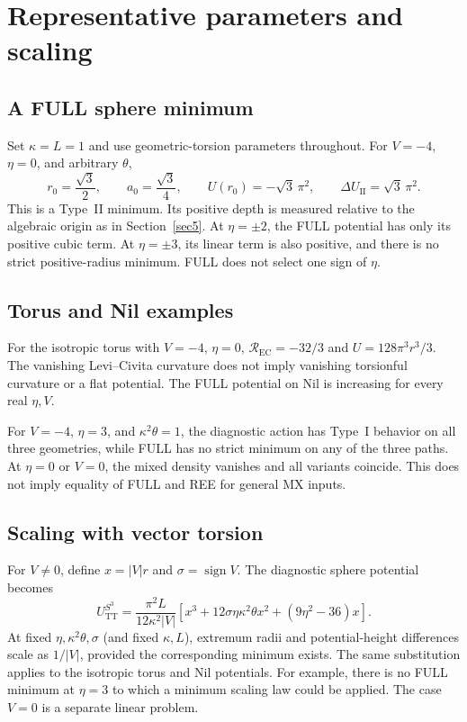\section{Representative parameters and scaling}\label{sec6}
\subsection{A FULL sphere minimum}
Set $\kappa=L=1$ and use geometric-torsion parameters throughout.
For $V=-4$, $\eta=0$, and arbitrary $\theta$,
\begin{equation}
r_0=\frac{\sqrt3}{2},\qquad
a_0=\frac{\sqrt3}{4},\qquad
U(r_0)=-\sqrt3\,\pi^2,\qquad
\Delta U_{\mathrm{II}}=\sqrt3\,\pi^2.
\tag{M6-01}\label{eq:M6-01}
\end{equation}
This is a Type~II minimum. Its positive depth is measured relative to
the algebraic origin as in Section~\ref{sec5}.
At $\eta=\pm2$, the FULL potential has only its positive cubic term.
At $\eta=\pm3$, its linear term is also positive, and there is no
strict positive-radius minimum. FULL does not select one sign of $\eta$.

\subsection{Torus and Nil examples}
For the isotropic torus with $V=-4$, $\eta=0$,
$\mathcal R_{\mathrm{EC}}=-32/3$ and
$U=128\pi^3r^3/3$. The vanishing Levi--Civita curvature does not imply
vanishing torsionful curvature or a flat potential.
The FULL potential on Nil is increasing for every real $\eta,V$.

For $V=-4$, $\eta=3$, and $\kappa^2\theta=1$, the diagnostic action
has Type~I behavior on all three geometries, while FULL has no strict
minimum on any of the three paths.
At $\eta=0$ or $V=0$, the mixed density vanishes and all variants coincide.
This does not imply equality of FULL and REE for general MX inputs.

\subsection{Scaling with vector torsion}
For $V\ne0$, define $x=|V|r$ and $\sigma=\operatorname{sign}V$.
The diagnostic sphere potential becomes
\begin{equation}
U^{S^3}_{\mathrm{TT}}
=\frac{\pi^2L}{12\kappa^2\lvert V\rvert}
\left[x^3+12\sigma\eta\kappa^2\theta x^2+(9\eta^2-36)x\right].
\tag{M6-02}\label{eq:M6-02}
\end{equation}
At fixed $\eta,\kappa^2\theta,\sigma$ (and fixed $\kappa,L$), extremum
radii and potential-height differences scale as $1/|V|$, provided the
corresponding minimum exists.
The same substitution applies to the isotropic torus and Nil potentials.
For example, there is no FULL minimum at $\eta=3$ to which a minimum
scaling law could be applied.
The case $V=0$ is a separate linear problem.

